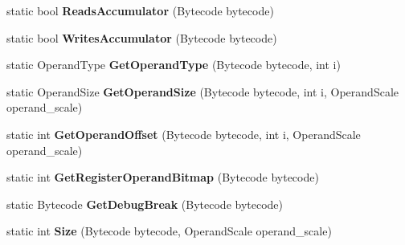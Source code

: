\begin{DoxyCompactItemize}
\item 
static bool {\bfseries Reads\+Accumulator} (Bytecode bytecode)\hypertarget{classv8_1_1internal_1_1interpreter_1_1_bytecodes_a6b5bdbc3ffda3916187c7b62ae14d07d}{}\label{classv8_1_1internal_1_1interpreter_1_1_bytecodes_a6b5bdbc3ffda3916187c7b62ae14d07d}

\item 
static bool {\bfseries Writes\+Accumulator} (Bytecode bytecode)\hypertarget{classv8_1_1internal_1_1interpreter_1_1_bytecodes_ad14137a048ae2f40a30f60d76f7c2537}{}\label{classv8_1_1internal_1_1interpreter_1_1_bytecodes_ad14137a048ae2f40a30f60d76f7c2537}

\item 
static Operand\+Type {\bfseries Get\+Operand\+Type} (Bytecode bytecode, int i)\hypertarget{classv8_1_1internal_1_1interpreter_1_1_bytecodes_a928f91d6919eede8a7fb803905dadf50}{}\label{classv8_1_1internal_1_1interpreter_1_1_bytecodes_a928f91d6919eede8a7fb803905dadf50}

\item 
static Operand\+Size {\bfseries Get\+Operand\+Size} (Bytecode bytecode, int i, Operand\+Scale operand\+\_\+scale)\hypertarget{classv8_1_1internal_1_1interpreter_1_1_bytecodes_a8dce1b14062b4a8368ac715f0e3c9e02}{}\label{classv8_1_1internal_1_1interpreter_1_1_bytecodes_a8dce1b14062b4a8368ac715f0e3c9e02}

\item 
static int {\bfseries Get\+Operand\+Offset} (Bytecode bytecode, int i, Operand\+Scale operand\+\_\+scale)\hypertarget{classv8_1_1internal_1_1interpreter_1_1_bytecodes_a28b2da32169415a2c614004ab991d696}{}\label{classv8_1_1internal_1_1interpreter_1_1_bytecodes_a28b2da32169415a2c614004ab991d696}

\item 
static int {\bfseries Get\+Register\+Operand\+Bitmap} (Bytecode bytecode)\hypertarget{classv8_1_1internal_1_1interpreter_1_1_bytecodes_a52c6b7737706bcd4ad0ff3daf3916b85}{}\label{classv8_1_1internal_1_1interpreter_1_1_bytecodes_a52c6b7737706bcd4ad0ff3daf3916b85}

\item 
static Bytecode {\bfseries Get\+Debug\+Break} (Bytecode bytecode)\hypertarget{classv8_1_1internal_1_1interpreter_1_1_bytecodes_a73c15d2ef6e681eb36695d40f787f521}{}\label{classv8_1_1internal_1_1interpreter_1_1_bytecodes_a73c15d2ef6e681eb36695d40f787f521}

\item 
static int {\bfseries Size} (Bytecode bytecode, Operand\+Scale operand\+\_\+scale)\hypertarget{classv8_1_1internal_1_1interpreter_1_1_bytecodes_a9f0498a82b60d9e0aeee6e628bd6bd05}{}\label{classv8_1_1internal_1_1interpreter_1_1_bytecodes_a9f0498a82b60d9e0aeee6e628bd6bd05}


\end{DoxyCompactItemize}
